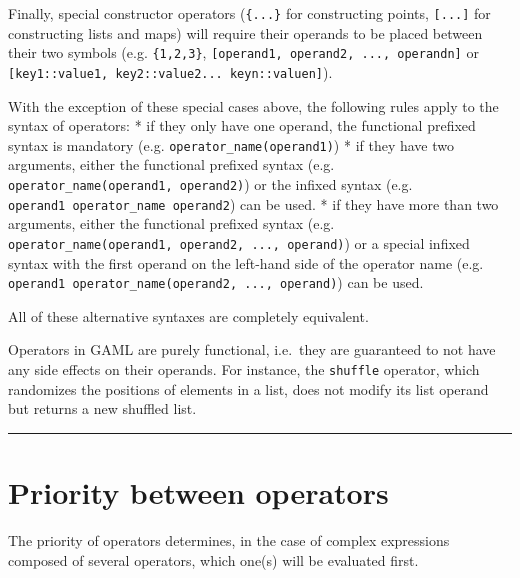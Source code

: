 \documentclass[]{book}
\theoremstyle{definition}
\theoremstyle{definition}
\theoremstyle{definition}
\theoremstyle{remark}
\begin{document}
Finally, special constructor operators (\texttt{\{...\}} for
constructing points, \texttt{{[}...{]}} for constructing lists and maps)
will require their operands to be placed between their two symbols (e.g.
\texttt{\{1,2,3\}}, \texttt{{[}operand1,\ operand2,\ ...,\ operandn{]}}
or \texttt{{[}key1::value1,\ key2::value2...\ keyn::valuen{]}}).

With the exception of these special cases above, the following rules
apply to the syntax of operators: * if they only have one operand, the
functional prefixed syntax is mandatory (e.g.
\texttt{operator\_name(operand1)}) * if they have two arguments, either
the functional prefixed syntax (e.g.
\texttt{operator\_name(operand1,\ operand2)}) or the infixed syntax
(e.g. \texttt{operand1\ operator\_name\ operand2}) can be used. * if
they have more than two arguments, either the functional prefixed syntax
(e.g. \texttt{operator\_name(operand1,\ operand2,\ ...,\ operand)}) or a
special infixed syntax with the first operand on the left-hand side of
the operator name (e.g.
\texttt{operand1\ operator\_name(operand2,\ ...,\ operand)}) can be
used.

All of these alternative syntaxes are completely equivalent.

Operators in GAML are purely functional, i.e.~they are guaranteed to not
have any side effects on their operands. For instance, the
\texttt{shuffle} operator, which randomizes the positions of elements in
a list, does not modify its list operand but returns a new shuffled
list.

\begin{center}\rule{0.5\linewidth}{\linethickness}\end{center}

\section{Priority between operators}\label{priority-between-operators-5}

The priority of operators determines, in the case of complex expressions
composed of several operators, which one(s) will be evaluated first.
\end{document}
